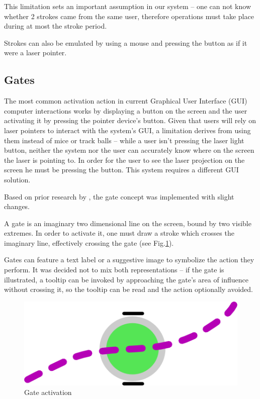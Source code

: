 This limitation sets an important assumption in our system -- one can not know whether 2 strokes came
from the same user, therefore operations must take place during at most the stroke period.

Strokes can also be emulated by using a mouse and pressing
the button as if it were a laser pointer.


\subsection{Gates}

The most common activation action in current Graphical User Interface (GUI) computer interactions works
by displaying a button on the screen and the user activating it by pressing the pointer device's button.
Given that users will rely on laser pointers to interact with the system's GUI, a limitation derives from
using them instead of mice or track balls -- while a user isn't pressing the laser light button,
neither the system nor the user can accurately know where on the screen the laser is pointing to.
In order for the user to see the laser projection on the screen he must be pressing the button.
This system requires a different GUI solution.

Based on prior research by \cite{CROSSY}, the gate concept was implemented with slight changes.

A gate is an imaginary two dimensional line on the screen, bound by two visible extremes.
In order to activate it, one must draw a stroke which crosses the imaginary line, effectively crossing the gate
(see Fig.\ref{fig:activation}).

Gates can feature a text label or a suggestive image to symbolize the action they perform.
It was decided not to mix both representations -- if the gate is illustrated, a tooltip can be invoked
by approaching the gate's area of influence without crossing it, so the tooltip can be read and the action optionally avoided.

\begin{figure}[ht]
	\centering
		\includegraphics{gfx/activation.png}
		\caption{Gate activation}
	\label{fig:activation}
\end{figure}



